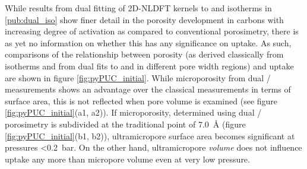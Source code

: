 While results from dual fitting of 2D-NLDFT kernels to  and  isotherms in \ref{pub:dual_iso} show finer detail in the porosity development in carbons with increasing degree of activation as compared to conventional  porosimetry, there is as yet no information on whether this has any significance on  uptake. As such, comparisons of the relationship between porosity (as derived classically from  isotherms and from dual fits to  and  in different pore width regions) and  uptake are shown in figure \ref{fig:pyPUC_initial}. While microporosity from dual / measurements shows an advantage over the classical measurements in terms of surface area, this is not reflected when pore volume is examined (see figure \ref{fig:pyPUC_initial}(a1, a2)). If microporosity, determined using dual / porosimetry is subdivided at the traditional point of \qty{7.0}{\angstrom} (figure \ref{fig:pyPUC_initial}(b1, b2)), \gls{ultramicropore} surface area becomes significant at pressures \qty{<0.2}{\bar}. On the other hand, \gls{ultramicropore} \textit{volume} does not influence  uptake any more than \gls{micropore} volume even at very low pressure.

